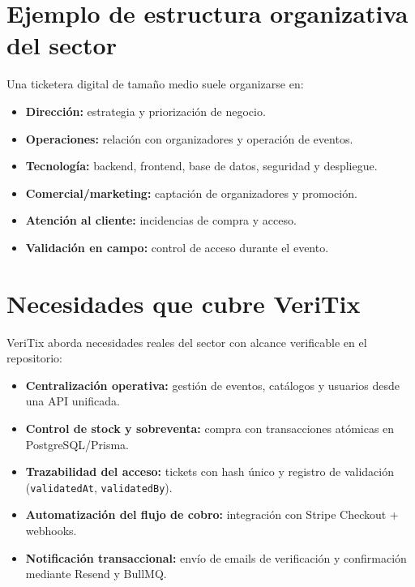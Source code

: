 \documentclass[
  11pt,
  a4paper,
  twoside=false,
  parskip=half               %
]{scrreprt}                  %
\providecommand{\tightlist}{%
  \setlength{\itemsep}{0pt}\setlength{\parskip}{0pt}}
\begin{document}
\hypertarget{ejemplo-de-estructura-organizativa-del-sector}{%
\section{Ejemplo de estructura organizativa del
sector}\label{ejemplo-de-estructura-organizativa-del-sector}}

Una ticketera digital de tamaño medio suele organizarse en:

\begin{itemize}
\tightlist
\item
  \textbf{Dirección:} estrategia y priorización de negocio.
\item
  \textbf{Operaciones:} relación con organizadores y operación de
  eventos.
\item
  \textbf{Tecnología:} backend, frontend, base de datos, seguridad y
  despliegue.
\item
  \textbf{Comercial/marketing:} captación de organizadores y promoción.
\item
  \textbf{Atención al cliente:} incidencias de compra y acceso.
\item
  \textbf{Validación en campo:} control de acceso durante el evento.
\end{itemize}

\hypertarget{necesidades-que-cubre-veritix}{%
\section{Necesidades que cubre
VeriTix}\label{necesidades-que-cubre-veritix}}

VeriTix aborda necesidades reales del sector con alcance verificable en
el repositorio:

\begin{itemize}
\tightlist
\item
  \textbf{Centralización operativa:} gestión de eventos, catálogos y
  usuarios desde una API unificada.
\item
  \textbf{Control de stock y sobreventa:} compra con transacciones
  atómicas en PostgreSQL/Prisma.
\item
  \textbf{Trazabilidad del acceso:} tickets con hash único y registro de
  validación (\texttt{validatedAt}, \texttt{validatedBy}).
\item
  \textbf{Automatización del flujo de cobro:} integración con Stripe
  Checkout + webhooks.
\item
  \textbf{Notificación transaccional:} envío de emails de verificación y
  confirmación mediante Resend y BullMQ.
\end{itemize}
\end{document}
